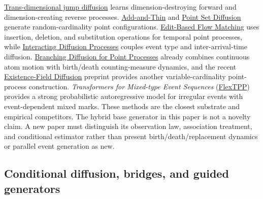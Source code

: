 \documentclass[11pt]{article}
\begin{document}
\href{https://papers.neurips.cc/paper_files/paper/2023/hash/83a10a480fbec91c88f6a9293b4d2b05-Abstract-Conference.html}{Trans-dimensional jump diffusion} learns dimension-destroying forward and dimension-creating reverse processes. \href{https://papers.neurips.cc/paper_files/paper/2023/hash/b1d9c7e7bd265d81aae8d74a7a6bd7f1-Abstract-Conference.html}{Add-and-Thin} and \href{https://proceedings.iclr.cc/paper_files/paper/2025/hash/cceb6b5d1781b6eb848f7e87bff5f74b-Abstract-Conference.html}{Point Set Diffusion} generate random-cardinality point configurations. \href{https://openreview.net/forum?id=FNf9IV1P2L}{Edit-Based Flow Matching} uses insertion, deletion, and substitution operations for temporal point processes, while \href{https://proceedings.mlr.press/v235/zeng24f.html}{Interacting Diffusion Processes} couples event type and inter-arrival-time diffusion. \href{https://openreview.net/pdf/574a07a3ab057971ab142c75a5fd8ad25a7c8312.pdf}{Branching Diffusion for Point Processes} already combines continuous atom motion with birth/\allowbreak{}death counting-measure dynamics, and the recent \href{https://arxiv.org/abs/2607.26428}{Existence-Field Diffusion} preprint provides another variable-cardinality point-process construction. \emph{Transformers for Mixed-type Event Sequences} (\href{https://papers.nips.cc/paper_files/paper/2025/hash/a6c7515ac435277dc92b75a07bb2257c-Abstract-Conference.html}{FlexTPP}) provides a strong probabilistic autoregressive model for irregular events with event-dependent mixed marks. These methods are the closest substrate and empirical competitors. The hybrid base generator in this paper is not a novelty claim. A new paper must distinguish its observation law, association treatment, and conditional estimator rather than present birth/\allowbreak{}death/\allowbreak{}replacement dynamics or parallel event generation as new.

\subsection{Conditional diffusion, bridges, and guided generators}
\label{sec:conditional-diffusion-bridges-and-guided-generators}
\end{document}
